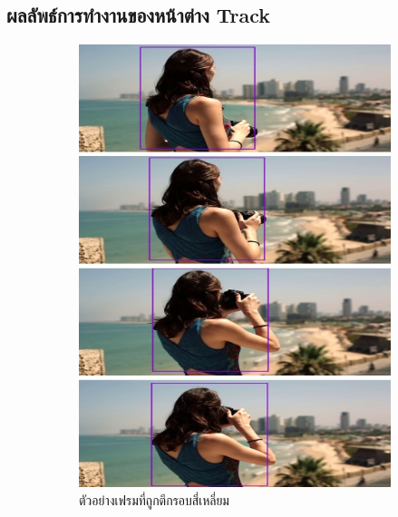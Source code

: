 \subsection*{ผลลัพธ์การทำงานของหน้าต่าง Track}
\begin{figure}[!ht]
    \centering
   \begin{subfigure}[b]{0.4\linewidth}
      \includegraphics[width=\linewidth]{chapter4/images/Result/result_select6.jpg}
      \caption{ตัวอย่างเฟรมที่ถูกตีกรอบสี่เหลี่ยม}
      \label{fig:result_tracked}
    \end{subfigure}
\\
    \begin{subfigure}[b]{0.7\linewidth}

\end{subfigure}
\end{figure}

